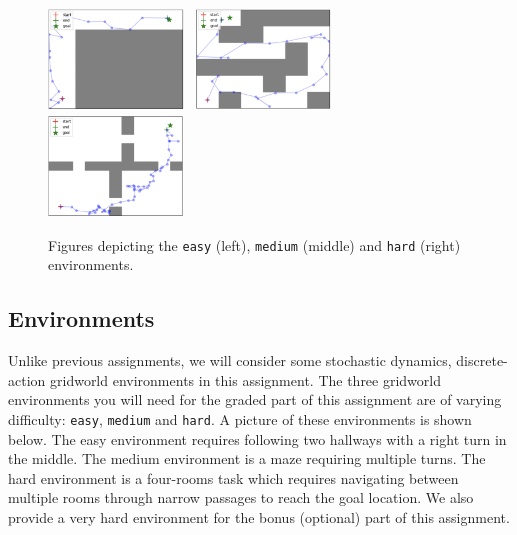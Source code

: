\documentclass{article}
\begin{document}
\begin{figure}[h]
    \centering
    \includegraphics[width=0.32\textwidth]{easy.png}~
    \includegraphics[width=0.32\textwidth]{medium.png}~
    \includegraphics[width=0.32\textwidth]{hard.png}
    \vspace{-10pt}
    \caption{Figures depicting the \texttt{easy} (left), \texttt{medium} (middle) and \texttt{hard} (right) environments.}
    \vspace{-10pt}
\end{figure}
\subsection{Environments}
Unlike previous assignments, we will consider some stochastic dynamics, discrete-action gridworld environments in this assignment. The three gridworld environments you will need for the graded part of this assignment are of varying difficulty: \texttt{easy}, \texttt{medium} and \texttt{hard}. A picture of these environments is shown below. The easy environment requires following two hallways with a right turn in the middle. The medium environment is a maze requiring multiple turns. The hard environment is a four-rooms task which requires navigating between multiple rooms through narrow passages to reach the goal location. We also provide a very hard environment for the bonus (optional) part of this assignment.
\end{document}
